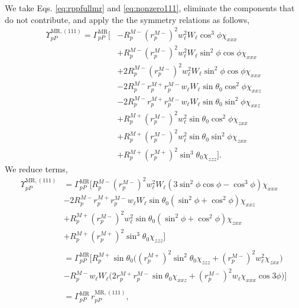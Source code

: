 We take Eqs. \eqref{eq:rppfullmr} and \eqref{eq:nonzero111}, eliminate the
components that do not contribute, and apply the the symmetry relations as
follows,
\begin{equation*}
\begin{split}
\Upsilon^{\mathrm{MR},(111)}_{pP} =
\Gamma^{\mathrm{MR}}_{pP}
\bigg[
&- R^{M-}_{p}\left(r^{M-}_{p}\right)^{2}w^{2}_{\ell}W_{\ell}
   \cos^{3}\phi\chi_{xxx}\\
&+ R^{M-}_{p}\left(r^{M-}_{p}\right)^{2}w^{2}_{\ell}W_{\ell}
   \sin^{2}\phi\cos\phi\chi_{xxx}\\
&+ 2R^{M-}_{p}\left(r^{M-}_{p}\right)^{2}w^{2}_{\ell}W_{\ell}
   \sin^{2}\phi\cos\phi\chi_{xxx}\\
&- 2R^{M-}_{p}r^{M+}_{p}r^{M-}_{p}w_{\ell}W_{\ell}
   \sin\theta_{0}\cos^{2}\phi\chi_{xxz}\\
&- 2R^{M-}_{p}r^{M+}_{p}r^{M-}_{p}w_{\ell}W_{\ell}
   \sin\theta_{0}\sin^{2}\phi\chi_{xxz}\\
&+ R^{M+}_{p}\left(r^{M-}_{p}\right)^{2}w^{2}_{\ell}
   \sin\theta_{0}\cos^{2}\phi\chi_{zxx}\\
&+ R^{M+}_{p}\left(r^{M-}_{p}\right)^{2}w^{2}_{\ell}
   \sin\theta_{0}\sin^{2}\phi\chi_{zxx}\\
&+ R^{M+}_{p}\left(r^{M+}_{p}\right)^{2}\sin^{3}\theta_{0}\chi_{zzz}
\bigg].
\end{split}
\end{equation*}
We reduce terms,
\begin{equation*}
\begin{split}
\Upsilon^{\mathrm{MR},(111)}_{pP} &=
\Gamma^{\mathrm{MR}}_{pP}
\big[
R^{M-}_{p}\left(r^{M-}_{p}\right)^{2}w^{2}_{\ell}W_{\ell}
  (3\sin^{2}\phi\cos\phi - \cos^{3}\phi)\chi_{xxx}\\
&- 2R^{M-}_{p}r^{M+}_{p}r^{M-}_{p}w_{\ell}W_{\ell}\sin\theta_{0}
  (\sin^{2}\phi + \cos^{2}\phi)\chi_{xxz}\\
&+ R^{M+}_{p}\left(r^{M-}_{p}\right)^{2}w^{2}_{\ell}\sin\theta_{0}
  (\sin^{2}\phi + \cos^{2}\phi)\chi_{zxx}\\
&+ R^{M+}_{p}\left(r^{M+}_{p}\right)^{2}\sin^{3}\theta_{0}\chi_{zzz}
\big]\\\\
&=
\Gamma^{\mathrm{MR}}_{pP}
\bigg[
R^{M+}_{p}\sin\theta_{0}
\Big(
  \left(r^{M+}_{p}\right)^{2}\sin^{2}\theta_{0}\chi_{zzz}
+ \left(r^{M-}_{p}\right)^{2}w^{2}_{\ell}\chi_{zxx}
\Big)\\
&- R^{M-}_{p}w_{\ell}W_{\ell}
\Big(
  2r^{M+}_{p}r^{M-}_{p}\sin\theta_{0}\chi_{xxz}
+ \left(r^{M-}_{p}\right)^{2}w_{\ell}\chi_{xxx}\cos3\phi
\Big)
\bigg]\\\\
& = \Gamma^{\mathrm{MR}}_{pP}\,r^{\mathrm{MR},(111)}_{pP},
\end{split}
\end{equation*}
